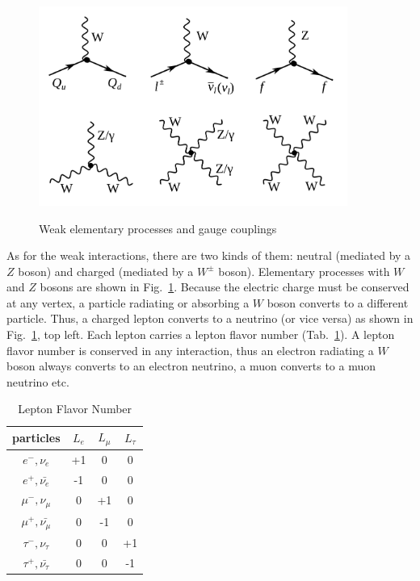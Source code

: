 \begin{figure}[htb]
  \begin{center}
    {\includegraphics[width=0.90\textwidth]{../figs/Intro/feynmW.png}}
    \caption{Weak elementary processes and gauge couplings}
    \label{fig:feynmW}
  \end{center}
\end{figure}

As for the weak interactions, there are two kinds of them: neutral (mediated by a $Z$ boson) and charged (mediated by a $W^\pm$ boson). Elementary processes with $W$ and $Z$ bosons are shown in Fig.~\ref{fig:feynmW}. Because the electric charge must be conserved at any vertex, a particle radiating or absorbing a $W$ boson converts to a different particle. Thus, a charged lepton converts to a neutrino (or vice versa) as shown in Fig.~\ref{fig:feynmW}, top left. Each lepton carries a lepton flavor number (Tab.~\ref{tab:LeptonFlavorNumber}). A lepton flavor number is conserved in any interaction, thus an electron radiating a $W$ boson  always converts to an electron neutrino, a muon converts to a muon neutrino etc.\\

\begin{table}[h]
  \begin{center}
  \caption{ Lepton Flavor Number}
  \vspace{5 mm}
  \begin{tabular}{|c|c|c|c|}
     \hline
     particles & $L_e$ & $L_{\mu}$ & $L_{\tau}$ \\ \hline
     $e^-,\nu_e$ &  +1  &  0  &  0  \\ \hline 
     $e^+, \bar{\nu_e}$ &  -1  &  0  &  0  \\ \hline 
     $\mu^-,\nu_{\mu}$ &  0  &  +1  &  0  \\ \hline 
     $\mu^+, \bar{\nu_{\mu}}$ &  0  &  -1  &  0  \\ \hline 
     $\tau^-,\nu_{\tau}$ &  0  &  0  &  +1  \\ \hline 
     $\tau^+, \bar{\nu_{\tau}}$ &  0  &  0  &  -1  \\ \hline 
  \end{tabular}
  \label{tab:LeptonFlavorNumber}
  \end{center}
\end{table}

